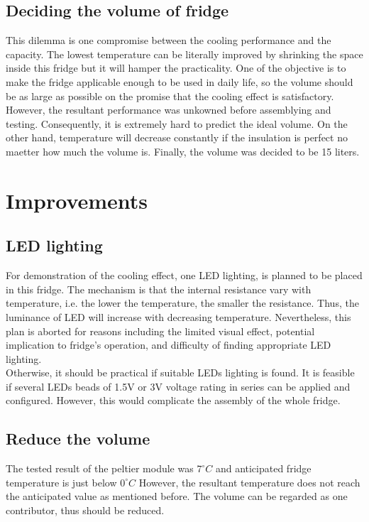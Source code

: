 \documentclass[12pt,onecolumn]{article}
\begin{document}
\subsection{Deciding the volume of fridge}
This dilemma is one compromise between the cooling performance and the capacity. The lowest temperature can be literally improved by shrinking the space inside this fridge but it will hamper the practicality. One of the objective is to make the fridge applicable enough to be used in daily life, so the volume should be as large as possible on the promise that the cooling effect is satisfactory. \\
However, the resultant performance was unkowned before assemblying and testing. Consequently, it is extremely hard to predict the ideal volume. On the other hand, temperature will decrease constantly if the insulation is perfect no maetter how much the volume is. Finally, the volume was decided to be 15 liters. \\

\section{Improvements}
\subsection{LED lighting}
For demonstration of the cooling effect, one LED lighting, is planned to be placed in this fridge. The mechanism is that the internal resistance vary with temperature, i.e. the lower the temperature, the smaller the resistance. Thus, the luminance of LED will increase with decreasing temperature. Nevertheless, this plan is aborted for reasons including the limited visual effect, potential implication to fridge's operation, and difficulty of finding appropriate LED lighting. \\
Otherwise, it should be practical if suitable LEDs lighting is found. It is feasible if several LEDs beads of 1.5V or 3V voltage rating in series can be applied and configured. However, this would complicate the assembly of the whole fridge.
\subsection{Reduce the volume}
The tested result of the peltier module was $7^{\circ}C$ and anticipated fridge temperature is just below $0^{\circ}C$ However, the resultant temperature does not reach the anticipated value as mentioned before. The volume can be regarded as one contributor, thus should be reduced.
\end{document}
